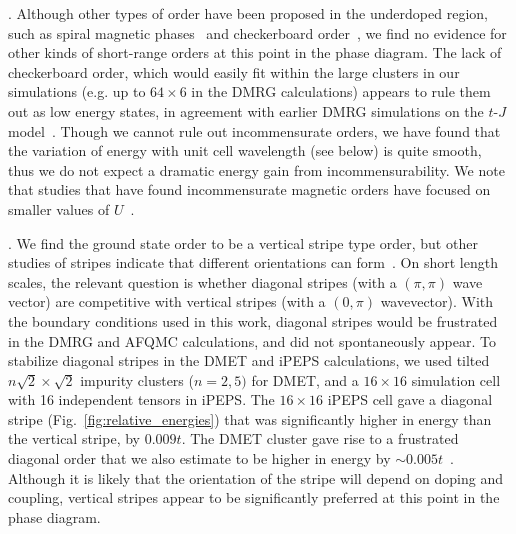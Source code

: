 \documentclass[12pt]{article}
\begin{document}
.  Although other types of order have been proposed in the underdoped region,
such as spiral magnetic phases~\cite{Chubukov1995,yamase2016coexistence} and checkerboard order~\cite{Vojta2002},
we find no evidence for other kinds of short-range orders at this point in the phase diagram. The lack  of 
checkerboard order, which would easily fit within the large clusters
in our simulations (e.g. up to $64 \times 6$ in the DMRG calculations)
appears to rule them out as low energy states, in agreement with earlier DMRG simulations on the $t$-$J$ model~\cite{white2004checkerboard}.
Though we cannot rule out incommensurate orders, we have found that the variation of energy with unit cell wavelength (see below) is 
quite smooth, thus we do not expect a dramatic energy gain from incommensurability. We note that studies that have found
incommensurate magnetic orders have focused on smaller values of $U$~\cite{yamase2016coexistence}.

. We find the ground state order to be a vertical stripe type order, but other
studies of stripes indicate that different orientations can form~\cite{Kato1990}. 
On short length scales, the relevant question is whether diagonal stripes (with a $(\pi, \pi)$ wave
vector) are competitive with vertical stripes (with a $(0, \pi)$ wavevector).
With the boundary conditions used in this work, diagonal stripes would be frustrated in the DMRG and AFQMC calculations,
and did not spontaneously appear.
To stabilize diagonal stripes in the DMET and iPEPS calculations, we used tilted $n\sqrt 2 \times \sqrt 2$  impurity clusters
($n=2,5)$ for DMET, and a
$16 \times 16$ simulation cell with 16 independent tensors in
iPEPS.
The $16 \times 16$ iPEPS cell
gave a diagonal stripe (Fig.~\ref{fig:relative_energies}) that was
significantly higher in energy than the vertical stripe, by $0.009t$.
The DMET cluster gave rise to a frustrated diagonal order that we also estimate to be
higher in energy by $\sim 0.005t$~\cite{supplementary}.
Although it is likely that the orientation of the stripe will depend on doping and coupling, 
vertical stripes appear to be significantly preferred at this point in the phase diagram.
\end{document}
